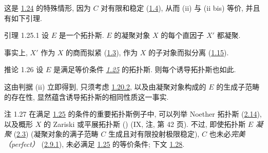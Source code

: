 这是 \hyperref[VI.cor1.24]{1.24} 的特殊情形,
因为 $C$ 对有限和稳定 (\hyperref[VI.cor1.4]{1.4}),
从而 (ii) 与 (ii bis) 等价, 并且有如下引理.

\begin{enonce*}{引理 1.25.1}
设 $E$ 是一个拓扑斯.
$E$ 的凝聚对象 $X$ 的每个直因子 $X'$ 都凝聚.
\end{enonce*}

事实上, $X'$ 作为 $X$ 的商而拟紧
(\hyperref[VI.prop1.3]{1.3}),
作为 $X$ 的子对象而拟分离 (\hyperref[VI.cor1.15]{1.15}).

\begin{enonce*}{推论 1.26}
设 $E$ 是满足等价条件 \emph{\hyperref[VI.cor1.25]{1.25}} 的拓扑斯.
则每个诱导拓扑斯也如此.
\end{enonce*}

这由判据 (ii) 立即得到,
只须考虑 \hyperref[VI.subsubsec1.20.2]{1.20.2},
以及由凝聚对象构成的 $E$ 的生成子范畴的存在性,
显然蕴含诱导拓扑斯的相同性质这一事实.

\begin{enonce*}[remark]{注 1.27}
在\pageoriginale{}满足 \hyperref[VI.cor1.25]{1.25} 的条件的重要拓扑斯例子中,
可以列举 Noether 拓扑斯 (\hyperref[VI.subsec2.14]{2.14}),
以及概形 $X$ 的 Zariski 或平展拓扑斯
() (\cf IX, 注, 第 42 页).
不过, 即使拓扑斯 $E$ \emph{凝聚}
(\hyperref[VI.def2.3]{2.3})
(\ie 凝聚对象的满子范畴 $C$ 生成且对有限投射极限稳定),
$C$ 也未必\emph{完美（perfect）}
(\hyperref[VI.def2.9.1]{2.9.1}),
\ie 未必满足 \hyperref[VI.cor1.25]{1.25} 的等价条件;
\cf 下文 \hyperref[VI.exer1.28]{1.28}.
\end{enonce*}

